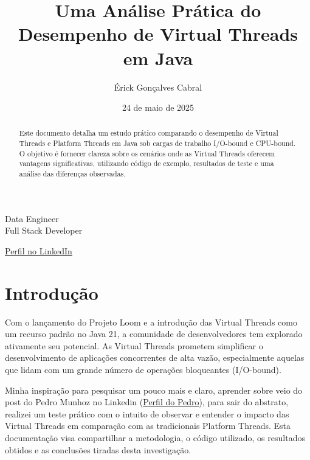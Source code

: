 \documentclass[12pt,a4paper]{article}
\title{Uma Análise Prática do Desempenho de Virtual Threads em Java}
\author{Érick Gonçalves Cabral} \\
\date{24 de maio de 2025}
\newcommand{\linkedinErickCabral}{https://www.linkedin.com/in/erick-cabralgca}
\newcommand{\linkedinPedroMunhoz}{https://www.linkedin.com/in/pedro-munhoz-675847222}
\begin{document}
\makeatletter 
\begin{titlepage}
    \centering 
    \vspace*{2.0cm} 
    {\Large \@author \par} 
    \vspace{0.4cm} 
    {\normalsize Data Engineer \\
    Full Stack Developer \par}
    \vfill 

    {\Huge \bfseries \@title \par} 

    \vfill 
    {\large \href{\linkedinErickCabral}{Perfil no LinkedIn} \par} 
    
    \vspace{0.5cm} 
    {\large \@date \par} 
    \vspace*{2cm} 

    \thispagestyle{empty} 
\end{titlepage}
\makeatother 

\begin{abstract}
Este documento detalha um estudo prático comparando o desempenho de Virtual Threads e Platform Threads em Java sob cargas de trabalho I/O-bound e CPU-bound. O objetivo é fornecer clareza sobre os cenários onde as Virtual Threads oferecem vantagens significativas, utilizando código de exemplo, resultados de teste e uma análise das diferenças observadas.
\end{abstract}
\clearpage 
\tableofcontents
\clearpage

\section{Introdução}
Com o lançamento do Projeto Loom e a introdução das Virtual Threads como um recurso padrão no Java 21, a comunidade de desenvolvedores tem explorado ativamente seu potencial. As Virtual Threads prometem simplificar o desenvolvimento de aplicações concorrentes de alta vazão, especialmente aquelas que lidam com um grande número de operações bloqueantes (I/O-bound).

Minha inspiração para pesquisar um pouco mais e claro, aprender sobre veio do post do Pedro Munhoz no Linkedin (\href{\linkedinPedroMunhoz}{Perfil do Pedro}), para sair do abstrato, realizei um teste prático com o intuito de observar e entender o impacto das Virtual Threads em comparação com as tradicionais Platform Threads. Esta documentação visa compartilhar a metodologia, o código utilizado, os resultados obtidos e as conclusões tiradas desta investigação.
\end{document}
